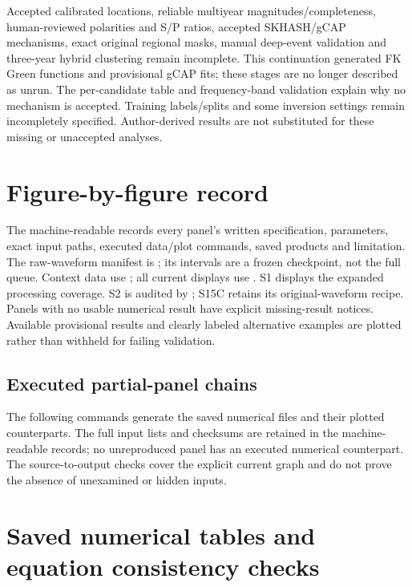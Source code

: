 Accepted calibrated locations, reliable multiyear magnitudes/completeness, human-reviewed polarities and S/P ratios, accepted SKHASH/gCAP mechanisms, exact original regional masks, manual deep-event validation and three-year hybrid clustering remain incomplete. This continuation generated FK Green functions and provisional gCAP fits; these stages are no longer described as unrun. The per-candidate table and frequency-band validation explain why no mechanism is accepted. Training labels/splits and some inversion settings remain incompletely specified. Author-derived results are not substituted for these missing or unaccepted analyses.

\section{Figure-by-figure record}
The machine-readable  records every panel's written specification, parameters, exact input paths, executed data/plot commands, saved products and limitation. The raw-waveform manifest is ; its intervals are a frozen checkpoint, not the full queue. Context data use ; all current displays use . S1 displays the expanded processing coverage. S2 is audited by ; S15C retains its original-waveform recipe. Panels with no usable numerical result have explicit missing-result notices. Available provisional results and clearly labeled alternative examples are plotted rather than withheld for failing validation.
\begingroup\footnotesize\endgroup

\subsection*{Executed partial-panel chains}
The following commands generate the saved numerical files and their plotted counterparts. The full input lists and checksums are retained in the machine-readable records; no unreproduced panel has an executed numerical counterpart. The source-to-output checks cover the explicit current graph and do not prove the absence of unexamined or hidden inputs.
\begingroup\footnotesize\endgroup

\section{Saved numerical tables and equation consistency checks}
